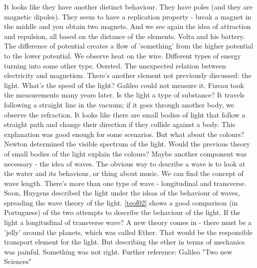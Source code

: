 \documentclass{cornell}
\begin{document}
{It looks like they have another distinct behaviour. They have poles (and they are magnetic dipoles). They seem to have a replication property - break a magnet in the middle and you obtain two magnets. And we see again the idea of attraction and repulsion, all based on the distance of the elements. Volta and his battery. The difference of potential creates a flow of 'something' from the higher potential to the lower potential. We observe heat on the wire. Different types of energy turning into some other type. Oersted. The unexpected relation between electricity and magnetism. There's another element not previously discussed: the light. What's the speed of the light? Galileo could not measure it. Fizeau took the measurements many years later. Is the light a type of substance? It travels following a straight line in the vacuum; if it goes through another body, we observe the refraction. It looks like there are small bodies of light that follow a straight path and change their direction if they collide against a body. This explanation was good enough for some scenarios. But what about the colours? Newton determined the visible spectrum of the light. Would the previous theory of small bodies of the light explain the colours? Maybe another component was necessary - the idea of waves. The obvious way to describe a wave is to look at the water and its behaviour, or thing about music. We can find the concept of wave length. There's more than one type of wave - longitudinal and transverse. Soon, Huygens described the light under the ideas of the behaviour of waves, spreading the wave theory of the light. \ref{teof02} shows a good comparison (in Portuguese) of the two attempts to describe the behaviour of the light. If the light a longitudinal of transverse wave? A new theory comes in - there must be a 'jelly' around the planets, which was called Ether. That would be the responsible transport element for the light. But describing the ether in terms of mechanics was painful. Something was not right. }%
{Further reference: Galileo "Two new Sciences"}%
\end{document}
